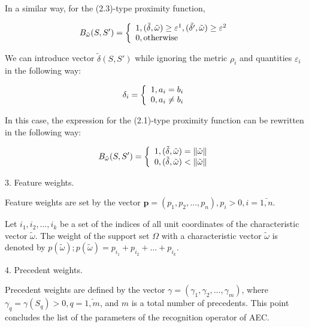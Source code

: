 In a similar way, for the (2.3)-type proximity function,

\begin{equation}
B_{\tilde{\omega}}(S, S') = \left\{ 
  \begin{array}{l l}
    1, (\tilde{\delta}, \tilde{\omega}) \geq \varepsilon^1, (\tilde{\delta'}, \tilde{\omega}) \geq \varepsilon^2 \\
    0, \text{otherwise}
  \end{array} \right.
\end{equation}

We can introduce vector $\tilde{\delta}(S, S')$ while ignoring the metric 
$\rho_i$ and quantities $\varepsilon_i$ in the following way:

\begin{equation}
\delta_i = \left\{ 
  \begin{array}{l l}
    1, a_i = b_i \\
    0, a_i \neq b_i
  \end{array} \right.
\end{equation}

In this case, the expression for the (2.1)-type proximity 
function can be rewritten in the following way:

\begin{equation}
B_{\tilde{\omega}}(S, S') = \left\{ 
  \begin{array}{l l}
    1, (\tilde{\delta}, \tilde{\omega}) = \|\tilde{\omega}\| \\
    0, (\tilde{\delta}, \tilde{\omega}) < \|\tilde{\omega}\|
  \end{array} \right.
\end{equation}

3. Feature weights. 

Feature weights are set by the vector 
$\textbf{p} = (p_1, p_2, \ldots, p_n), p_i > 0, i = \bar{1, n}$. 

Let ${i_1, i_2, \ldots, i_k}$ be a set of the indices of all unit 
coordinates of the characteristic vector $\tilde{\omega}$. The weight 
of the support set $\Omega$ with a characteristic vector $\tilde{\omega}$ 
is denoted by $p(\tilde{\omega});  p(\tilde{\omega}) = p_{i_1} + p_{i_2} + \ldots+ p_{i_k}$.

4. Precedent weights.

Precedent weights are defined by the vector 
$ \gamma = (\gamma_1, \gamma_2, \ldots, \gamma_{m})$, 
where $\gamma_q = \gamma(S_q)>0, q = \bar{1, m} $, and $m$ is a 
total number of precedents. This point concludes the list of 
the parameters of the recognition operator of AEC.

